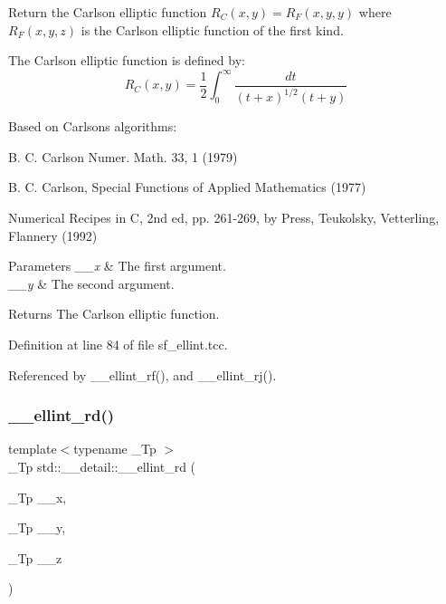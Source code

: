 Return the Carlson elliptic function $ R_C(x,y) = R_F(x,y,y) $ where $ R_F(x,y,z) $ is the Carlson elliptic function of the first kind. 

The Carlson elliptic function is defined by\+: \[ R_C(x,y) = \frac{1}{2} \int_0^\infty \frac{dt}{(t + x)^{1/2}(t + y)} \]

Based on Carlson\textquotesingle{}s algorithms\+:
\begin{DoxyItemize}
\item B. C. Carlson Numer. Math. 33, 1 (1979)
\item B. C. Carlson, Special Functions of Applied Mathematics (1977)
\item Numerical Recipes in C, 2nd ed, pp. 261-\/269, by Press, Teukolsky, Vetterling, Flannery (1992)
\end{DoxyItemize}


\begin{DoxyParams}{Parameters}
{\em \+\_\+\+\_\+x} & The first argument. \\
\hline
{\em \+\_\+\+\_\+y} & The second argument. \\
\hline
\end{DoxyParams}
\begin{DoxyReturn}{Returns}
The Carlson elliptic function. 
\end{DoxyReturn}


Definition at line 84 of file sf\+\_\+ellint.\+tcc.



Referenced by \+\_\+\+\_\+ellint\+\_\+rf(), and \+\_\+\+\_\+ellint\+\_\+rj().

\mbox{\label{namespacestd_1_1____detail_ac05883415a662fc6f9855dd8d1da921f}} 
\subsubsection{\texorpdfstring{\+\_\+\+\_\+ellint\+\_\+rd()}{\_\_ellint\_rd()}}
{\footnotesize\ttfamily template$<$typename \+\_\+\+Tp $>$ \\
\+\_\+\+Tp std\+::\+\_\+\+\_\+detail\+::\+\_\+\+\_\+ellint\+\_\+rd (\begin{DoxyParamCaption}\item[{\+\_\+\+Tp}]{\+\_\+\+\_\+x,  }\item[{\+\_\+\+Tp}]{\+\_\+\+\_\+y,  }\item[{\+\_\+\+Tp}]{\+\_\+\+\_\+z }\end{DoxyParamCaption})}



